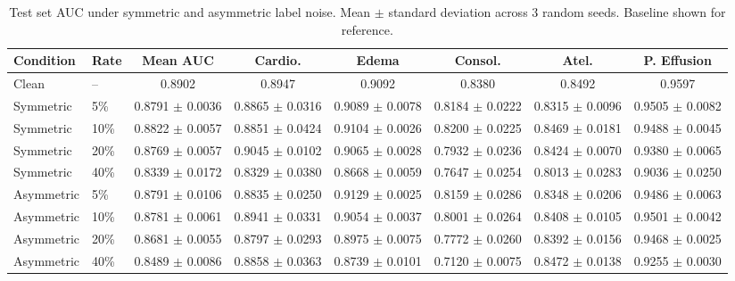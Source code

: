 \begin{table}[h]
\centering
\caption{Test set AUC under symmetric and asymmetric label noise. Mean $\pm$ standard deviation across 3 random seeds. Baseline shown for reference.}
\label{tab:noise_results}
\begin{tabular}{llcccccc}
\toprule
Condition & Rate & Mean AUC & Cardio. & Edema & Consol. & Atel. & P. Effusion \\
\midrule
Clean & -- & 0.8902 & 0.8947 & 0.9092 & 0.8380 & 0.8492 & 0.9597 \\
\midrule
Symmetric & 5\% & 0.8791 $\pm$ 0.0036 & 0.8865 $\pm$ 0.0316 & 0.9089 $\pm$ 0.0078 & 0.8184 $\pm$ 0.0222 & 0.8315 $\pm$ 0.0096 & 0.9505 $\pm$ 0.0082 \\
Symmetric & 10\% & 0.8822 $\pm$ 0.0057 & 0.8851 $\pm$ 0.0424 & 0.9104 $\pm$ 0.0026 & 0.8200 $\pm$ 0.0225 & 0.8469 $\pm$ 0.0181 & 0.9488 $\pm$ 0.0045 \\
Symmetric & 20\% & 0.8769 $\pm$ 0.0057 & 0.9045 $\pm$ 0.0102 & 0.9065 $\pm$ 0.0028 & 0.7932 $\pm$ 0.0236 & 0.8424 $\pm$ 0.0070 & 0.9380 $\pm$ 0.0065 \\
Symmetric & 40\% & 0.8339 $\pm$ 0.0172 & 0.8329 $\pm$ 0.0380 & 0.8668 $\pm$ 0.0059 & 0.7647 $\pm$ 0.0254 & 0.8013 $\pm$ 0.0283 & 0.9036 $\pm$ 0.0250 \\
\midrule
Asymmetric & 5\% & 0.8791 $\pm$ 0.0106 & 0.8835 $\pm$ 0.0250 & 0.9129 $\pm$ 0.0025 & 0.8159 $\pm$ 0.0286 & 0.8348 $\pm$ 0.0206 & 0.9486 $\pm$ 0.0063 \\
Asymmetric & 10\% & 0.8781 $\pm$ 0.0061 & 0.8941 $\pm$ 0.0331 & 0.9054 $\pm$ 0.0037 & 0.8001 $\pm$ 0.0264 & 0.8408 $\pm$ 0.0105 & 0.9501 $\pm$ 0.0042 \\
Asymmetric & 20\% & 0.8681 $\pm$ 0.0055 & 0.8797 $\pm$ 0.0293 & 0.8975 $\pm$ 0.0075 & 0.7772 $\pm$ 0.0260 & 0.8392 $\pm$ 0.0156 & 0.9468 $\pm$ 0.0025 \\
Asymmetric & 40\% & 0.8489 $\pm$ 0.0086 & 0.8858 $\pm$ 0.0363 & 0.8739 $\pm$ 0.0101 & 0.7120 $\pm$ 0.0075 & 0.8472 $\pm$ 0.0138 & 0.9255 $\pm$ 0.0030 \\
\bottomrule
\end{tabular}
\end{table}